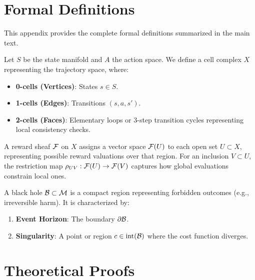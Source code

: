\section{Formal Definitions}
\label{app:formal_defs}

This appendix provides the complete formal definitions summarized in the main text.

\begin{definition}
\label{def:trajectory_space_full}
Let $S$ be the state manifold and $A$ the action space. We define a cell complex $X$ representing the trajectory space, where:
\begin{itemize}
    \item \textbf{0-cells (Vertices)}: States $s \in S$.
    \item \textbf{1-cells (Edges)}: Transitions $(s, a, s')$.
    \item \textbf{2-cells (Faces)}: Elementary loops or 3-step transition cycles representing local consistency checks.
\end{itemize}
\end{definition}

\begin{definition}
\label{def:reward_sheaf_full}
A reward sheaf $\mathcal{F}$ on $X$ assigns a vector space $\mathcal{F}(U)$ to each open set $U \subset X$, representing possible reward valuations over that region. For an inclusion $V \subset U$, the restriction map $\rho_{UV}: \mathcal{F}(U) \to \mathcal{F}(V)$ captures how global evaluations constrain local ones.
\end{definition}

\begin{definition}
\label{def:black_hole_full}
A black hole $\mathcal{B} \subset \mathcal{M}$ is a compact region representing forbidden outcomes (e.g., irreversible harm). It is characterized by:
\begin{enumerate}
    \item \textbf{Event Horizon}: The boundary $\partial \mathcal{B}$.
    \item \textbf{Singularity}: A point or region $c \in \text{int}(\mathcal{B})$ where the cost function diverges.
\end{enumerate}
\end{definition}

\section{Theoretical Proofs}
\label{app:proofs}

